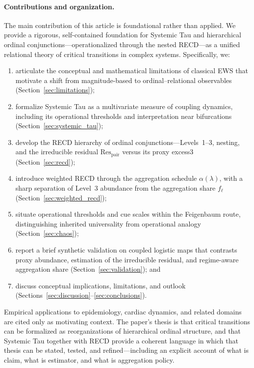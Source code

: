 \documentclass[11pt,a4paper]{article}
\begin{document}
\paragraph{Contributions and organization.}
The main contribution of this article is foundational rather than
applied. We provide a rigorous, self-contained foundation for Systemic
Tau and hierarchical ordinal conjunctions---operationalized through the
nested RECD---as a unified relational theory of critical transitions in
complex systems. Specifically, we:
\begin{enumerate}[leftmargin=*,itemsep=2pt]
  \item articulate the conceptual and mathematical limitations of
  classical EWS that motivate a shift from magnitude-based to
  ordinal--relational observables (Section~\ref{sec:limitations});
  \item formalize Systemic Tau as a multivariate measure of coupling
  dynamics, including its operational thresholds and interpretation
  near bifurcations (Section~\ref{sec:systemic_tau});
  \item develop the RECD hierarchy of ordinal conjunctions---Levels~1--3,
  nesting, and the irreducible residual
  $\mathrm{Res}_{\mathrm{pair}}$ versus its proxy excess3
  (Section~\ref{sec:recd});
  \item introduce weighted RECD through the aggregation schedule
  $\alpha(\lambda)$, with a sharp separation of Level~3 abundance from
  the aggregation share $f_\ell$ (Section~\ref{sec:weighted_recd});
  \item situate operational thresholds and cue scales within the
  Feigenbaum route, distinguishing inherited universality from
  operational analogy (Section~\ref{sec:chaos});
  \item report a brief synthetic validation on coupled logistic maps that
  contrasts proxy abundance, estimation of the irreducible residual, and
  regime-aware aggregation share (Section~\ref{sec:validation}); and
  \item discuss conceptual implications, limitations, and outlook
  (Sections~\ref{sec:discussion}--\ref{sec:conclusions}).
\end{enumerate}

Empirical applications to epidemiology, cardiac dynamics, and related
domains are cited only as motivating context. The paper's thesis is that
critical transitions can be formalized as reorganizations of hierarchical
ordinal structure, and that Systemic Tau together with RECD provide a
coherent language in which that thesis can be stated, tested, and
refined---including an explicit account of what is claim, what is
estimator, and what is aggregation policy.
\end{document}
